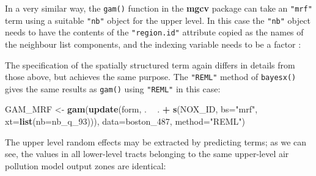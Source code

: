 \documentclass[]{book}
\newenvironment{Shaded}{\begin{snugshade}}{\end{snugshade}}
\newcommand{\CommentTok}[1]{\textcolor[rgb]{0.56,0.35,0.01}{\textit{#1}}}
\newcommand{\ControlFlowTok}[1]{\textcolor[rgb]{0.13,0.29,0.53}{\textbf{#1}}}
\newcommand{\DataTypeTok}[1]{\textcolor[rgb]{0.13,0.29,0.53}{#1}}
\newcommand{\DecValTok}[1]{\textcolor[rgb]{0.00,0.00,0.81}{#1}}
\newcommand{\KeywordTok}[1]{\textcolor[rgb]{0.13,0.29,0.53}{\textbf{#1}}}
\newcommand{\NormalTok}[1]{#1}
\newcommand{\OperatorTok}[1]{\textcolor[rgb]{0.81,0.36,0.00}{\textbf{#1}}}
\newcommand{\OtherTok}[1]{\textcolor[rgb]{0.56,0.35,0.01}{#1}}
\newcommand{\StringTok}[1]{\textcolor[rgb]{0.31,0.60,0.02}{#1}}
\begin{document}
In a very similar way, the \texttt{gam()} function in the \textbf{mgcv} package \citep{R-mgcv} can take an \texttt{"mrf"} term using a suitable \texttt{"nb"} object for the upper level. In this case the \texttt{"nb"} object needs to have the contents of the \texttt{"region.id"} attribute copied as the names of the neighbour list components, and the indexing variable needs to be a factor \citep{wood:17}:

\begin{Shaded}
\end{Shaded}

The specification of the spatially structured term again differs in details from those above, but achieves the same purpose. The \texttt{"REML"} method of \texttt{bayesx()} gives the same results as \texttt{gam()} using \texttt{"REML"} in this case:

\begin{Shaded}
\begin{Highlighting}[]
\NormalTok{GAM_MRF <-}\StringTok{ }\KeywordTok{gam}\NormalTok{(}\KeywordTok{update}\NormalTok{(form, . }\OperatorTok{~}\StringTok{ }\NormalTok{. }\OperatorTok{+}\StringTok{ }\KeywordTok{s}\NormalTok{(NOX_ID, }\DataTypeTok{bs=}\StringTok{"mrf"}\NormalTok{, }\DataTypeTok{xt=}\KeywordTok{list}\NormalTok{(}\DataTypeTok{nb=}\NormalTok{nb_q_}\DecValTok{93}\NormalTok{))),}
               \DataTypeTok{data=}\NormalTok{boston_}\DecValTok{487}\NormalTok{, }\DataTypeTok{method=}\StringTok{"REML"}\NormalTok{)}
\end{Highlighting}
\end{Shaded}

The upper level random effects may be extracted by predicting terms; as we can see, the values in all lower-level tracts belonging to the same upper-level air pollution model output zones are identical:

\begin{Shaded}
\end{Shaded}
\end{document}
